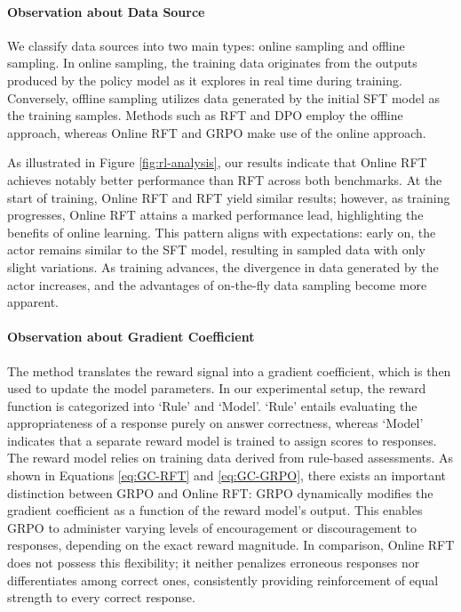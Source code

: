 \begin{itemize}[topsep=0pt]
\begin{itemize}[topsep=0pt]
\paragraph{Observation about Data Source} We classify data sources into two main types: online sampling and offline sampling. In online sampling, the training data originates from the outputs produced by the policy model as it explores in real time during training. Conversely, offline sampling utilizes data generated by the initial SFT model as the training samples. Methods such as RFT and DPO employ the offline approach, whereas Online RFT and GRPO make use of the online approach.

As illustrated in Figure \ref{fig:rl-analysis}, our results indicate that Online RFT achieves notably better performance than RFT across both benchmarks. At the start of training, Online RFT and RFT yield similar results; however, as training progresses, Online RFT attains a marked performance lead, highlighting the benefits of online learning. This pattern aligns with expectations: early on, the actor remains similar to the SFT model, resulting in sampled data with only slight variations. As training advances, the divergence in data generated by the actor increases, and the advantages of on-the-fly data sampling become more apparent.

\paragraph{Observation about Gradient Coefficient} The method translates the reward signal into a gradient coefficient, which is then used to update the model parameters. In our experimental setup, the reward function is categorized into `Rule' and `Model'. `Rule' entails evaluating the appropriateness of a response purely on answer correctness, whereas `Model' indicates that a separate reward model is trained to assign scores to responses. The reward model relies on training data derived from rule-based assessments. As shown in Equations \ref{eq:GC-RFT} and \ref{eq:GC-GRPO}, there exists an important distinction between GRPO and Online RFT: GRPO dynamically modifies the gradient coefficient as a function of the reward model's output. This enables GRPO to administer varying levels of encouragement or discouragement to responses, depending on the exact reward magnitude. In comparison, Online RFT does not possess this flexibility; it neither penalizes erroneous responses nor differentiates among correct ones, consistently providing reinforcement of equal strength to every correct response.


\end{itemize}
\end{itemize}

